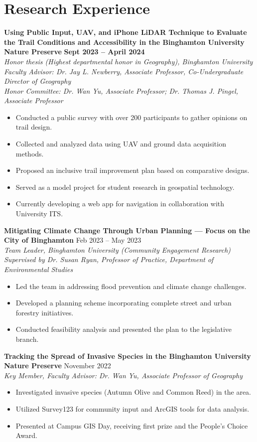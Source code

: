 \documentclass[11pt]{article}
\begin{document}
\section*{Research Experience}
\noindent
\textbf{Using Public Input, UAV, and iPhone LiDAR Technique to Evaluate the Trail Conditions and Accessibility in the Binghamton University Nature Preserve} \hfill \textbf{Sept 2023 -- April 2024} \\
\textit{Honor thesis (Highest departmental honor in Geography), Binghamton University} \\
\textit{Faculty Advisor: Dr. Jay L. Newberry, Associate Professor, Co-Undergraduate Director of Geography \\
Honor Committee: Dr. Wan Yu, Associate Professor; Dr. Thomas J. Pingel, Associate Professor}
\begin{itemize}[leftmargin=*]
    \item Conducted a public survey with over 200 participants to gather opinions on trail design.
    \item Collected and analyzed data using UAV and ground data acquisition methods.
    \item Proposed an inclusive trail improvement plan based on comparative designs.
    \item Served as a model project for student research in geospatial technology.
    \item Currently developing a web app for navigation in collaboration with University ITS.
\end{itemize}

\noindent
\textbf{Mitigating Climate Change Through Urban Planning --- Focus on the City of Binghamton} \hfill Feb 2023 -- May 2023 \\
\textit{Team Leader, Binghamton University (Community Engagement Research) \\
Supervised by Dr. Susan Ryan, Professor of Practice, Department of Environmental Studies}
\begin{itemize}[leftmargin=*]
    \item Led the team in addressing flood prevention and climate change challenges.
    \item Developed a planning scheme incorporating complete street and urban forestry initiatives.
    \item Conducted feasibility analysis and presented the plan to the legislative branch.
\end{itemize}

\noindent
\textbf{Tracking the Spread of Invasive Species in the Binghamton University Nature Preserve} \hfill November 2022 \\
\textit{Key Member, Faculty Advisor: Dr. Wan Yu, Associate Professor of Geography}
\begin{itemize}[leftmargin=*]
    \item Investigated invasive species (Autumn Olive and Common Reed) in the area.
    \item Utilized Survey123 for community input and ArcGIS tools for data analysis.
    \item Presented at Campus GIS Day, receiving first prize and the People's Choice Award.
\end{itemize}
\end{document}
